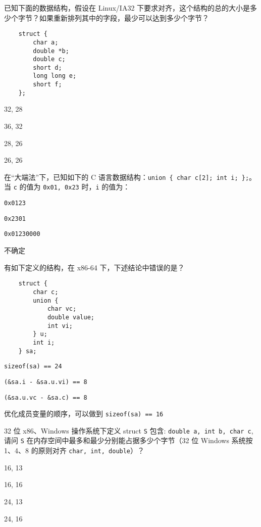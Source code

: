 \begin{problems}
\begin{choices}
        \end{choices}
         已知下面的数据结构，假设在 Linux/IA32 下要求对齐，这个结构的总的大小是多少个字节？如果重新排列其中的字段，最少可以达到多少个字节？
        \begin{verbatim}
    struct {
        char a;
        double *b;
        double c;
        short d;
        long long e;
        short f;
    };
        \end{verbatim}
        \begin{choices}
            \item 32, 28
            \item 36, 32
            \item 28, 26
            \item 26, 26
        \end{choices}
         在“大端法”下，已知如下的 C 语言数据结构：\verb|union { char c[2]; int i; };|。当 \verb|c| 的值为 \verb|0x01, 0x23| 时，\verb|i| 的值为：
        \begin{choices}
            \item \verb|0x0123|
            \item \verb|0x2301|
            \item \verb|0x01230000|
            \item 不确定
        \end{choices}
         有如下定义的结构，在 x86-64 下，下述结论中错误的是？
        \begin{verbatim}
    struct {
        char c;
        union {
            char vc;
            double value;
            int vi;
        } u;
        int i;
    } sa;
        \end{verbatim}
        \begin{choices}
            \item \verb|sizeof(sa) == 24|
            \item \verb|(&sa.i - &sa.u.vi) == 8|
            \item \verb|(&sa.u.vc - &sa.c) == 8|
            \item 优化成员变量的顺序，可以做到 \verb|sizeof(sa) == 16|
        \end{choices}
         32 位 x86、Windows 操作系统下定义 struct \verb|S| 包含: \verb|double a, int b, char c|, 请问 \verb|S| 在内存空间中最多和最少分别能占据多少个字节（32 位 Windows 系统按 1、4、8 的原则对齐 \verb|char, int, double|）？
        \begin{choices}
            \item 16, 13
            \item 16, 16
            \item 24, 13
            \item 24, 16
        \end{choices}
    \end{problems}